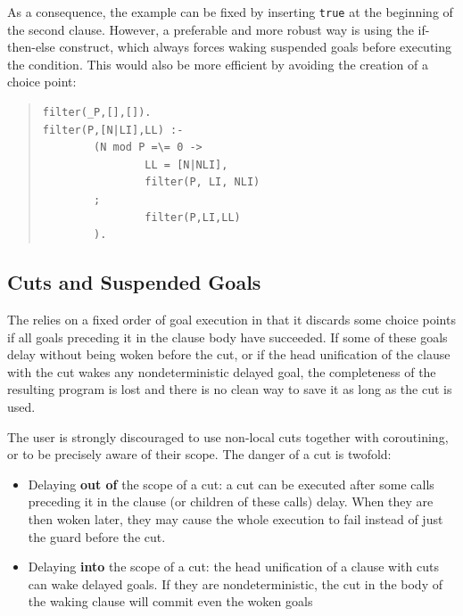 As a consequence, the example can be fixed by inserting {\tt true} at the
beginning of the second clause.
However, a preferable and more robust way is using the if-then-else
construct, which always forces waking suspended goals before
executing the condition.
This would also be more efficient by avoiding the creation of a choice point:
\begin{quote}
\begin{verbatim}
filter(_P,[],[]).
filter(P,[N|LI],LL) :-
        (N mod P =\= 0 ->
                LL = [N|NLI],
                filter(P, LI, NLI)
        ;
                filter(P,LI,LL)
        ).
\end{verbatim}
\end{quote}



\subsection{Cuts and Suspended Goals}
\label{delaycut}%
The
relies on a fixed order of goal execution in that it discards
some choice points if all goals preceding it in the clause body have
succeeded.
If some of these goals delay without being woken before the cut,
or if the head unification of the
clause with the cut wakes any nondeterministic delayed goal,
the completeness of the resulting program is lost
and there is no clean way to save it as long as the cut is used.

The user is strongly discouraged to use non-local cuts together with
coroutining, or to be precisely aware of their scope.
The danger of a cut is twofold:
\begin{itemize}
\item Delaying {\bf out of} the scope of a cut:
a cut can be executed after some calls preceding it in the clause
(or children of these calls) delay. When they are then woken later,
they may cause the whole execution to fail instead of just the
guard before the cut.

\item Delaying {\bf into} the scope of a cut:
the head unification of a clause with cuts can wake delayed goals.
If they are nondeterministic, the cut in the body of the waking clause
will commit even the woken goals
\end{itemize}

